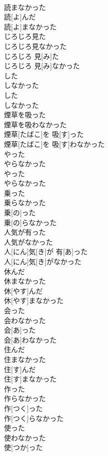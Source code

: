 \documentclass[8pt]{extreport}
\begin{document}
\begin{CJK}{UTF8}{min}
\\	読まなかった	
\\	読[よ]んだ 
\\	読[よ]まなかった
\\	じろじろ見た 
\\	じろじろ見なかった	
\\	じろじろ 見[み]た 
\\	じろじろ 見[み]なかった
\\	した 
\\	しなかった	
\\	した 
\\	しなかった
\\	煙草を吸った 
\\	煙草を吸わなかった	
\\	煙草[たばこ]を 吸[す]った 
\\	煙草[たばこ]を 吸[す]わなかった
\\	やった 
\\	やらなかった	
\\	やった 
\\	やらなかった
\\	乗った 
\\	乗らなかった	
\\	乗[の]った 
\\	乗[の]らなかった
\\	人気が有った 
\\	人気がなかった	
\\	人[にん]気[き]が 有[あ]った 
\\	人[にん]気[き]がなかった
\\	休んだ 
\\	休まなかった	
\\	休[やす]んだ 
\\	休[やす]まなかった
\\	会った 
\\	会わなかった	
\\	会[あ]った 
\\	会[あ]わなかった
\\	住んだ 
\\	住まなかった	
\\	住[す]んだ 
\\	住[す]まなかった
\\	作った 
\\	作らなかった	
\\	作[つく]った 
\\	作[つく]らなかった
\\	使った 
\\	使わなかった	
\\	使[つか]った 

\end{CJK}
\end{document}
